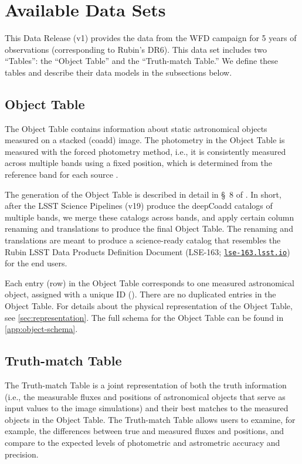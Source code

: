 \documentclass[modern]{descnote}
\newcommand*{\https}[1]{\href{https://#1}{\nolinkurl{#1}}}
\begin{document}
\section{Available Data Sets}
\label{sec:products}

This Data Release (v1) provides the data from the WFD campaign for 5 years of observations (corresponding to Rubin's DR6). This data set includes two ``Tables'': the ``Object Table'' and the ``Truth-match Table.'' We define these tables and describe their data models in the subsections below. 

\subsection{Object Table}
\label{sec:object}

The Object Table contains information about static astronomical objects measured on a stacked (coadd) image. The photometry in the Object Table is measured with the forced photometry method, i.e., it is consistently measured across multiple bands using a fixed position, which is determined from the reference band for each source \citep[Sec.~3.4 of][]{10.1093/pasj/psx080}. 

The generation of the Object Table is described in detail in \S~8 of \cite{2020arXiv201005926L}. In short, after the LSST Science Pipelines (v19) produce the deepCoadd catalogs of multiple bands, we merge these catalogs across bands, and apply certain column renaming and translations to produce the final Object Table. The renaming and translations are meant to produce a science-ready catalog that resembles the Rubin LSST Data Products Definition Document (LSE-163; \https{lse-163.lsst.io}) for the end users. 

Each entry (row) in the Object Table corresponds to one measured astronomical object, assigned with a unique ID (). There are no duplicated entries in the Object Table. For details about the physical representation of the Object Table, see \autoref{sec:representation}. The full schema for the Object Table can be found in \autoref{app:object-schema}. 

\subsection{Truth-match Table}
\label{sec:truth}

The Truth-match Table is a joint representation of both the truth information (i.e., the measurable fluxes and positions of astronomical objects that serve as input values to the image simulations) and their best matches to the measured objects in the Object Table. The Truth-match Table allows users to examine, for example, the differences between true and measured fluxes and positions, and compare to the expected levels of photometric and astrometric accuracy and precision.
\end{document}
